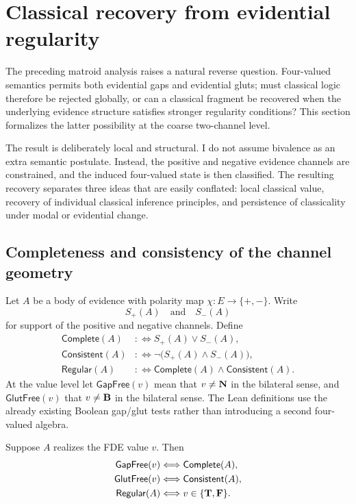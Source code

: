 \section{Classical recovery from evidential regularity}
\label{sec:classical-recovery}

The preceding matroid analysis raises a natural reverse question.  Four-valued
semantics permits both evidential gaps and evidential gluts; must classical logic
therefore be rejected globally, or can a classical fragment be recovered when the
underlying evidence structure satisfies stronger regularity conditions?  This section
formalizes the latter possibility at the coarse two-channel level.

The result is deliberately local and structural.  I do not assume bivalence as an
extra semantic postulate.  Instead, the positive and negative evidence channels are
constrained, and the induced four-valued state is then classified.  The resulting
recovery separates three ideas that are easily conflated: local classical value,
recovery of individual classical inference principles, and persistence of classicality
under modal or evidential change.

\subsection{Completeness and consistency of the channel geometry}

Let \(A\) be a body of evidence with polarity map
\(\chi:E\to\{+,-\}\).  Write
\[
  S_+(A) \quad\text{and}\quad S_-(A)
\]
for support of the positive and negative channels.  Define
\begin{align*}
  \mathsf{Complete}(A)
    &:\Longleftrightarrow S_+(A)\lor S_-(A),\\
  \mathsf{Consistent}(A)
    &:\Longleftrightarrow \neg\bigl(S_+(A)\land S_-(A)\bigr),\\
  \mathsf{Regular}(A)
    &:\Longleftrightarrow
       \mathsf{Complete}(A)\land\mathsf{Consistent}(A).
\end{align*}
At the value level let \(\mathsf{GapFree}(v)\) mean that \(v\neq\mathbf{N}\) in the
bilateral sense, and \(\mathsf{GlutFree}(v)\) that \(v\neq\mathbf{B}\) in the bilateral
sense.  The Lean definitions use the already existing Boolean gap/glut tests rather
than introducing a second four-valued algebra.

\begin{theorem}
\label{thm:classical-recovery-geometry}
Suppose \(A\) realizes the FDE value \(v\).  Then
\begin{align*}
  \mathsf{GapFree}(v)
    &\Longleftrightarrow \mathsf{Complete}(A),\\
  \mathsf{GlutFree}(v)
    &\Longleftrightarrow \mathsf{Consistent}(A),\\
  \mathsf{Regular}(A)
    &\Longleftrightarrow v\in\{\mathbf{T},\mathbf{F}\}.
\end{align*}
\statusverified
\end{theorem}

